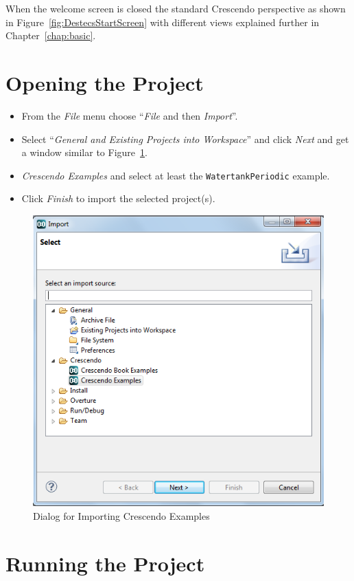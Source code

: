 \documentclass{crescendorepchap}
\begin{document}
When the welcome screen is closed the standard Crescendo perspective as shown in Figure~\ref{fig:DestecsStartScreen} with different views explained further in Chapter~\ref{chap:basic}.

\section{Opening the Project}

\begin{itemize}
\item
  From the \emph{File} menu choose ``\emph{File} and then \emph{Import}''.
\item
  Select ``\emph{General and Existing Projects into Workspace}''
  and click \emph{Next} and get a window similar to Figure~\ref{fig:importex}.
\item
  \emph{Crescendo Examples} and select at least the
  \texttt{WatertankPeriodic} example.
\item
  Click \emph{Finish} to import the selected project(s).
\end{itemize}

\begin{figure}[htbp]
\centering
\includegraphics[width=.8\textwidth]{images/DestecsImportDialog.png}
\caption{Dialog for Importing Crescendo Examples\label{fig:importex}}
\end{figure}

\section{Running the Project}
\end{document}
